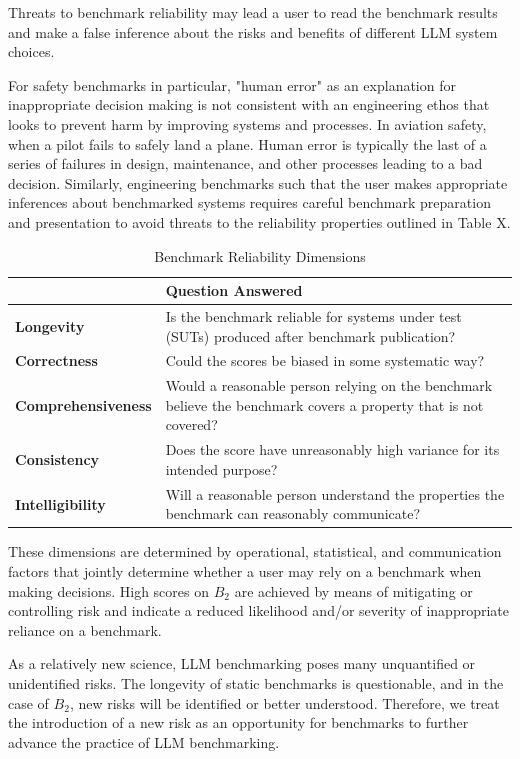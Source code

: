 \documentclass{article}
\begin{document}
Threats to benchmark reliability may lead a user to read the benchmark results and make a false inference about the risks and benefits of different LLM system choices.

For safety benchmarks in particular, "human error" as an explanation for inappropriate decision making is not consistent with an engineering ethos that looks to prevent harm by improving systems and processes. In aviation safety, when a pilot fails to safely land a plane. Human error is typically the last of a series of failures in design, maintenance, and other processes leading to a bad decision. Similarly, engineering benchmarks such that the user makes appropriate inferences about benchmarked systems requires careful benchmark preparation and presentation to avoid threats to the reliability properties outlined in Table X.

\begin{table}[h!]
  \caption{Benchmark Reliability Dimensions}
  \label{tab:benchmark-reliability-dimensions}
  \centering
  \begin{tabular}{lp{10cm}}
    \toprule
    & \textbf{Question Answered} \\
    \midrule
    \textbf{Longevity} & Is the benchmark reliable for systems under test (SUTs) produced after benchmark publication? \\
    \textbf{Correctness} & Could the scores be biased in some systematic way? \\
    \textbf{Comprehensiveness} & Would a reasonable person relying on the benchmark believe the benchmark covers a property that is not covered? \\
    \textbf{Consistency} & Does the score have unreasonably high variance for its intended purpose? \\
    \textbf{Intelligibility} & Will a reasonable person understand the properties the benchmark can reasonably communicate? \\
    \bottomrule
  \end{tabular}
\end{table}

These dimensions are determined by operational, statistical, and communication factors that jointly determine whether a user may rely on a benchmark when making decisions. High scores on \(B_2\) are achieved by means of mitigating or controlling risk and indicate a reduced likelihood and/or severity of inappropriate reliance on a benchmark.

As a relatively new science, LLM benchmarking poses many unquantified or unidentified risks. The longevity of static benchmarks is questionable, and in the case of \(B_2\), new risks will be identified or better understood. Therefore, we treat the introduction of a new risk as an opportunity for benchmarks to further advance the practice of LLM benchmarking.
\end{document}
